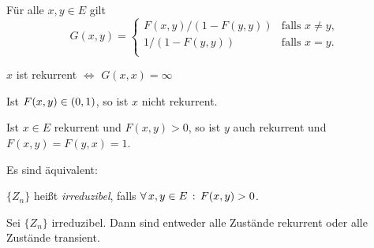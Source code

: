 \documentclass{cheat-sheet}
\begin{document}
\begin{satz}
  Für alle $x, y \in E$ gilt
  \[
    G(x, y) =
    \begin{cases}
      F(x, y)/(1 - F(y, y)) & \text{falls $x \neq y$}, \\
      1/(1 - F(y, y)) & \text{falls $x = y$}. \\
    \end{cases}
  \]
\end{satz}

\begin{kor}
  $x$ ist rekurrent $\iff$ $G(x, x) = \infty$
\end{kor}

\begin{lem}
  Ist $F(x, y) \in \left( 0, 1 \right)$, so ist $x$ nicht rekurrent.
\end{lem}

\begin{satz}
  \begin{minipage}[t]{0.88 \linewidth}
    Ist $x \in E$ rekurrent und $F(x, y) > 0$, so ist $y$ auch rekurrent und $F(x, y) = F(y, x) = 1$.
  \end{minipage}
\end{satz}

\begin{satz}
  Es sind äquivalent:
  \begin{itemize}
  \end{itemize}
\end{satz}

\iffalse
\begin{interp}
  $F(x, y) > 0$ bedeutet, dass nach jedem Besuch in~$x$ der Zustand $y$ auch besucht wird mit positiver Wahrscheinlichkeit und die Rekurrenz von~$x$ bedeutet, dass $x$ unendlich oft besucht wird.
  Der Satz sagt, dass dann auch $y$ unendlich oft besucht wird.
\end{interp}
\fi

\begin{defn}
  $\{ Z_n \}$ heißt \emph{irreduzibel}, falls $\forall \, {x, y \in E} \,:\, F(x, y) > 0$.
\end{defn}

\begin{satz}
  Sei $\{ Z_n \}$ irreduzibel.
  Dann sind entweder alle Zustände rekurrent oder alle Zustände transient.
\end{satz}
\end{document}
